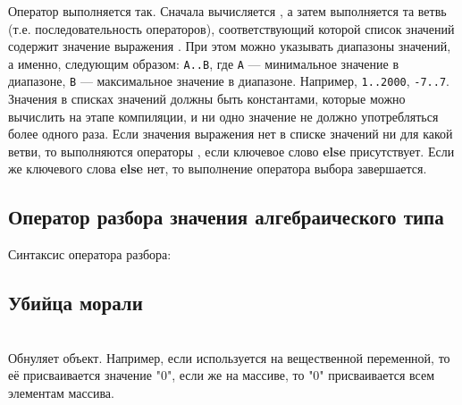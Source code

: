 \documentclass[10pt]{report}
\begin{document}
Оператор выполняется так. Сначала вычисляется \textcolor{Green}{}, а затем выполняется та ветвь (т.е. последовательность операторов),
соответствующий которой список значений содержит значение выражения \textcolor{Green}{}. При этом можно указывать диапазоны значений,
а именно, следующим образом: \texttt{A..B}, где \texttt{A} --- минимальное значение в диапазоне, \texttt{B} --- максимальное значение в диапазоне. Например,
\texttt{1..2000}, \texttt{-7..7}. Значения в списках значений должны быть константами, которые можно вычислить на этапе компиляции, и ни одно значение не должно употребляться
более одного раза. Если значения выражения \textcolor{Green}{} нет в списке значений ни для какой ветви, то выполняются операторы
\textcolor{Green}{}, если ключевое слово \textbf{else} присутствует. Если же ключевого слова \textbf{else} нет, то выполнение оператора выбора
завершается.

    \subsection{Оператор разбора значения алгебраического типа}
Синтаксис оператора разбора:

\textcolor{Green}{}
\subsection{Убийца морали}
\textcolor{Green}{} \\
Обнуляет объект. Например, если используется на вещественной переменной, то её присваивается значение "0", если же на массиве, то "0" присваивается всем элементам массива.
\end{document}
